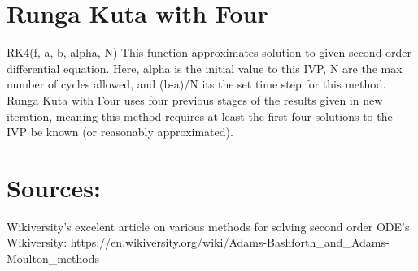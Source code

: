 \documentclass [12pt]{article}
\begin{document}
\newpage
\section{Runga Kuta with Four}
\indent RK4(f, a, b, alpha, N)
\indent \indent This function approximates solution to given second order differential equation. Here, alpha is the initial value to this IVP, N are the max number of cycles allowed, and (b-a)/N its the set time step for this method. Runga Kuta with Four uses four previous stages of the results given in new iteration, meaning this method requires at least the first four solutions to the IVP be known (or reasonably approximated).


\newpage
\section{Sources:}
Wikiversity's excelent article on various methods for solving second order ODE's
\indent  Wikiversity: https://en.wikiversity.org/wiki/Adams-Bashforth_and_Adams-Moulton_methods


\nocite{*} 
\printbibliography
\end{document}
